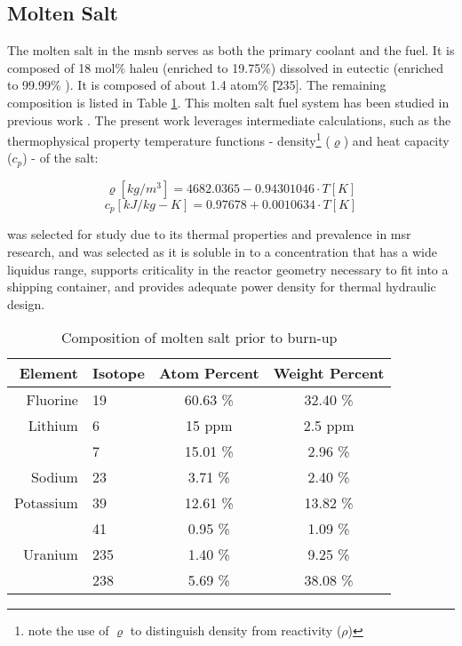 \subsection{Molten Salt}
The molten salt in the \acs{msnb} serves as both the primary coolant and the fuel. It is composed of 18 mol\% \acs{haleu} \UF \; (enriched to 19.75\%) dissolved in eutectic \flinak (enriched to 99.99\% \Li[7]). It is composed of about 1.4 atom\% \U[235]. The remaining composition is listed in Table \ref{tab:saltcomp}. This molten salt fuel system has been studied in previous work \cite{CarterPHD}. The present work leverages intermediate calculations, such as the thermophysical property temperature functions - density\footnote{note the use of $\varrho$ to distinguish density from reactivity ($\rho$)} ($\varrho$) and heat capacity ($c_p$) - of the salt:

\begin{equation}\label{eq:saltdens}
    \varrho[kg/m^3] = 4682.0365 - 0.94301046\cdot T[K] 
\end{equation}
\begin{equation}\label{eq:saltcp}
    c_p[kJ/kg-K] = 0.97678 + 0.0010634\cdot T[K]
\end{equation}

\flinak was selected for study due to its thermal properties and prevalence in \acs{msr} research, and \UF \; was selected as it is soluble in \flinak to a concentration that has a wide liquidus range, supports criticality in the reactor geometry necessary to fit into a shipping container, and provides adequate power density for thermal hydraulic design. 

\begin{table}[ht!]
    \caption[Molten salt composition]{Composition of molten salt prior to burn-up}
    \centering
    \begin{tabular}{rl|cc}
     Element&Isotope&Atom Percent & Weight Percent \\ \hline
     Fluorine  & 19  & 60.63 \%  & 32.40 \% \\  \hline
     Lithium   & 6   & 15 ppm    & 2.5 ppm  \\
               & 7   & 15.01 \%  & 2.96 \%  \\ \hline
     Sodium    & 23  &  3.71 \%  & 2.40 \%  \\ \hline
     Potassium & 39  & 12.61 \%  & 13.82 \% \\
               & 41  & 0.95 \%  & 1.09 \%  \\ \hline
    Uranium    & 235 & 1.40 \%   & 9.25 \%  \\
               & 238 & 5.69 \%   & 38.08 \% \\
    \end{tabular}
    \label{tab:saltcomp}
\end{table}

